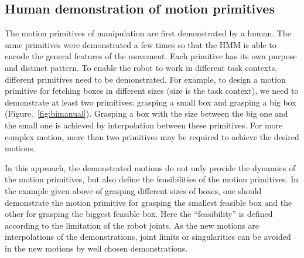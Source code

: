 \subsection{Human demonstration of motion primitives}
\label{cha5:sec2:demonstration}
The motion primitives of manipulation are first demonstrated by a human. The same primitives were demonstrated a few times so that the HMM is able to encode the general features of the movement. Each primitive has its own purpose and distinct pattern. To enable the robot to work in different task contexts, different primitives need to be demonstrated. For example, to design a motion primitive for fetching boxes in different sizes (size is the task context), we need to demonstrate at least two primitives: grasping a small box and grasping a big box (Figure.~\ref{fig:bimanual}). Grasping a box with the size between the big one and the small one is achieved by interpolation between these primitives. For more complex motion, more than two primitives may be required to achieve the desired motions.

In this approach, the demonstrated motions do not only provide the dynamics of the motion primitives, but also define the feasibilities of the motion primitives. In the example given above of grasping different sizes of boxes, one should demonstrate the motion primitive for grasping the smallest feasible box and the other for grasping the biggest feasible box. Here the ``feasibility'' is defined according to the limitation of the robot joints. As the new motions are interpolations of the demonstrations, joint limits or singularities can be avoided in the new motions by well chosen demonstrations.

